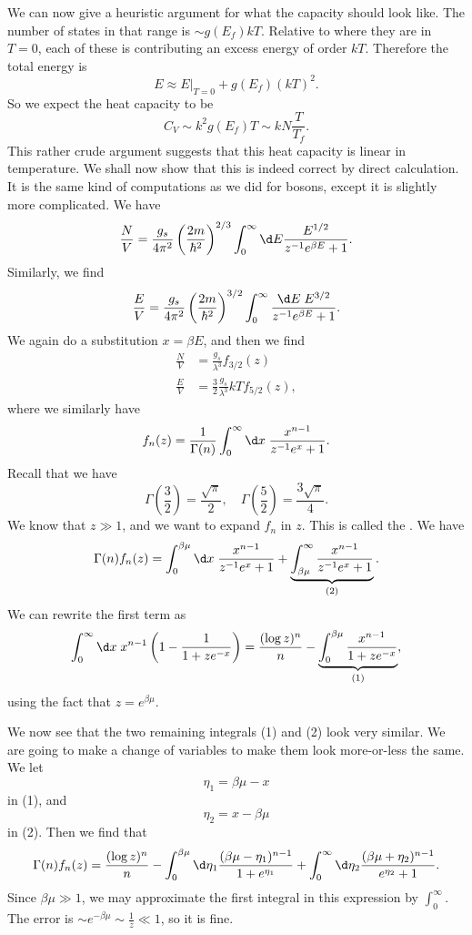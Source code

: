 \documentclass[a4paper]{article}
\begin{document}
We can now give a heuristic argument for what the capacity should look like. The number of states in that range is $\sim g(E_f) kT$. Relative to where they are in $T = 0$, each of these is contributing an excess energy of order $kT$. Therefore the total energy is
\[
  E \approx E|_{T = 0} + g(E_f) (kT)^2.
\]
So we expect the heat capacity to be
\[
  C_V \sim k^2 g(E_f) T \sim kN \frac{T}{T_f}.
\]
This rather crude argument suggests that this heat capacity is linear in temperature. We shall now show that this is indeed correct by direct calculation. It is the same kind of computations as we did for bosons, except it is slightly more complicated. We have
\[
  \frac{N}{V} = \frac{g_s}{4\pi^2}\left(\frac{2m}{\hbar^2}\right)^{2/3} \int_0^\infty \d E \frac{E^{1/2}}{z^{-1} e^{\beta E} + 1}.
\]
Similarly, we find
\[
  \frac{E}{V} = \frac{g_s}{4\pi^2} \left(\frac{2m}{\hbar^2}\right)^{3/2} \int_0^\infty \frac{\d E \; E^{3/2}}{z^{-1} e^{\beta E} + 1}.
\]
We again do a substitution $x = \beta E$, and then we find
\begin{align*}
  \frac{N}{V} &= \frac{g_s}{\lambda^3} f_{3/2}(z)\\
  \frac{E}{V} &= \frac{3}{2} \frac{g_s}{\lambda^3}kT f_{5/2}(z),
\end{align*}
where we similarly have
\[
  f_n(z) = \frac{1}{\Gamma(n)} \int_0^\infty \d x\; \frac{x^{n - 1}}{z^{-1}e^x + 1}.
\]
Recall that we have
\[
  \Gamma\left(\frac{3}{2}\right) = \frac{\sqrt{\pi}}{2},\quad \Gamma\left(\frac{5}{2}\right) = \frac{3\sqrt{\pi}}{4}.
\]
We know that $z \gg 1$, and we want to expand $f_n$ in $z$. This is called the . We have
\[
  \Gamma(n) f_n(z) = \int_0^{\beta\mu} \d x\; \frac{x^{n - 1}}{z^{-1}e^x + 1} + \underbrace{\int_{\beta\mu}^\infty \frac{x^{n - 1}}{z^{-1}e^x + 1}}_{(2)}.
\]
We can rewrite the first term as
\[
  \int_0^\infty \d x\; x^{n - 1}\left(1 - \frac{1}{1 + z e^{-x}}\right) = \frac{(\log z)^n}{n} - \underbrace{\int_0^{\beta\mu} \frac{x^{n - 1}}{1 + z e^{-x}}}_{(1)},
\]
using the fact that $z = e^{\beta\mu}$.

We now see that the two remaining integrals (1) and (2) look very similar. We are going to make a change of variables to make them look more-or-less the same. We let
\[
  \eta_1 = \beta \mu - x
\]
in (1), and
\[
  \eta_2 = x - \beta \mu
\]
in (2). Then we find that
\[
  \Gamma(n) f_n(z) = \frac{(\log z)^n}{n} - \int_0^{\beta\mu} \d \eta_1 \frac{(\beta \mu - \eta_1)^{n - 1}}{1 + e^{\eta_1}} + \int_0^\infty \d \eta_2 \frac{(\beta \mu + \eta_2)^{n - 1}}{e^{\eta_2} + 1}.
\]
Since $\beta\mu \gg 1$, we may approximate the first integral in this expression by $\int_0^\infty$. The error is $\sim e^{-\beta\mu} \sim \frac{1}{z} \ll 1$, so it is fine.
\end{document}
